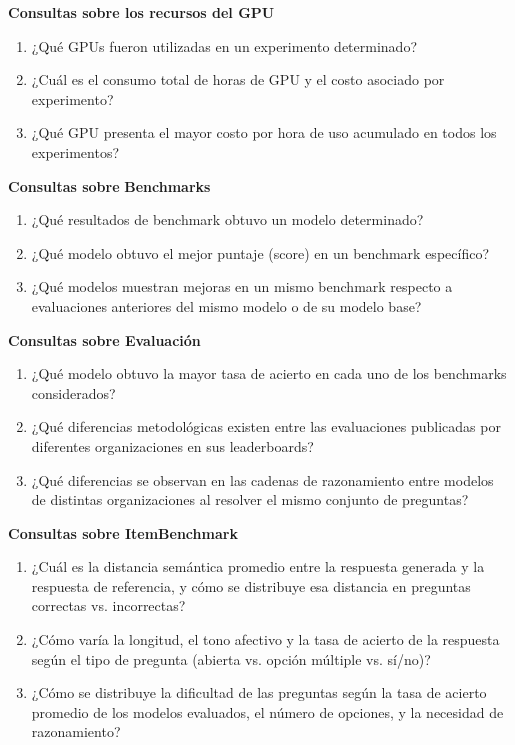 \documentclass[12pt,a4paper]{article}
\begin{document}
\textbf{Consultas sobre los recursos del GPU}
{\begin{enumerate}
  \item ¿Qué GPUs fueron utilizadas en un experimento determinado?
  \item ¿Cuál es el consumo total de horas de GPU y el costo asociado por experimento?
  \item ¿Qué GPU presenta el mayor costo por hora de uso acumulado en todos los experimentos?
\end{enumerate}
}

\textbf{Consultas sobre }\textbf{Benchmarks}
{\begin{enumerate}
  \item ¿Qué resultados de benchmark obtuvo un modelo determinado?
  \item ¿Qué modelo obtuvo el mejor puntaje (score) en un benchmark específico?
  \item ¿Qué modelos muestran mejoras en un mismo benchmark respecto a evaluaciones anteriores del mismo modelo o de su modelo base?
\end{enumerate}
}

\noindent \textbf{Consultas sobre Evaluación}
{\begin{enumerate}
  \item ¿Qué modelo obtuvo la mayor tasa de acierto en cada uno de los benchmarks considerados?
  \item ¿Qué diferencias metodológicas existen entre las evaluaciones publicadas por diferentes organizaciones en sus leaderboards?
  \item ¿Qué diferencias se observan en las cadenas de razonamiento entre modelos de distintas organizaciones al resolver el mismo conjunto de preguntas?
\end{enumerate}
}

\noindent \textbf{Consultas sobre ItemBenchmark}
{\begin{enumerate}
  \item ¿Cuál es la distancia semántica promedio entre la respuesta generada y la respuesta de referencia, y cómo se distribuye esa distancia en preguntas correctas vs. incorrectas?
  \item ¿Cómo varía la longitud, el tono afectivo y la tasa de acierto de la respuesta según el tipo de pregunta (abierta vs. opción múltiple vs. sí/no)?
  \item ¿Cómo se distribuye la dificultad de las preguntas según la tasa de acierto promedio de los modelos evaluados, el número de opciones, y la necesidad de razonamiento?
\end{enumerate}
}
\end{document}
